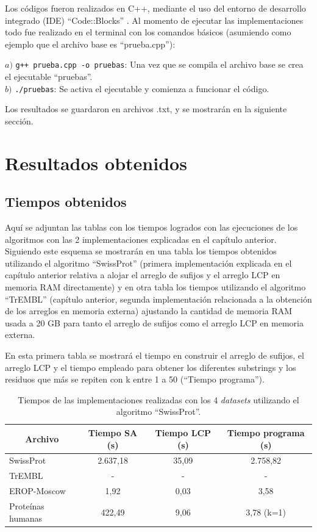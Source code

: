 Los códigos fueron realizados en C++, mediante el uso del entorno de desarrollo integrado (IDE) ``Code::Blocks'' \cite{codeblocks}. Al momento de ejecutar las implementaciones todo fue realizado en el terminal con los comandos básicos (asumiendo como ejemplo que el archivo base es ``prueba.cpp''):

$a)$ \texttt{g++ prueba.cpp -o pruebas}: Una vez que se compila el archivo base se crea el ejecutable ``pruebas''.\\
$b)$ \texttt{./pruebas}: Se activa el ejecutable y comienza a funcionar el código.

Los resultados se guardaron en archivos .txt, y se mostrarán en la siguiente sección.

\section{Resultados obtenidos}

\subsection{Tiempos obtenidos}

Aquí se adjuntan las tablas con los tiempos logrados con las ejecuciones de los algoritmos con las 2 implementaciones explicadas en el capítulo anterior. Siguiendo este esquema se mostrarán en una tabla los tiempos obtenidos utilizando el algoritmo ``SwissProt'' (primera implementación explicada en el capítulo anterior relativa a alojar el arreglo de sufijos y el arreglo LCP en memoria RAM directamente) y en otra tabla los tiempos utilizando el algoritmo ``TrEMBL'' (capítulo anterior, segunda implementación relacionada a la obtención de los arreglos en memoria externa) ajustando la cantidad de memoria RAM usada a 20 GB para tanto el arreglo de sufijos como el arreglo LCP en memoria externa. 

En esta primera tabla se mostrará el tiempo en construir el arreglo de sufijos, el arreglo LCP y el tiempo empleado para obtener los diferentes substrings y los residuos que más se repiten con k entre 1 a 50 (``Tiempo programa'').

\begin{table}[h]
\centering
\begin{tabular}{|l|c|c|c|}
\hline
\multicolumn{1}{|c|}{\textbf{Archivo}}  & \textbf{Tiempo SA (s)} & \textbf{Tiempo LCP (s)} & \textbf{Tiempo programa (s)} \\ \hline
SwissProt         & 2.637,18                & 35,09                   & 2.758,82                         \\
TrEMBL            & -                & -                &        -                  \\
EROP-Moscow       & 1,92                   & 0,03                    & 3,58                         \\
Proteínas humanas & 422,49                 & 9,06                    & 3,78 (k=1)                         \\ \hline
\end{tabular}
\caption{Tiempos de las implementaciones realizadas con los 4 \textit{datasets} utilizando el algoritmo ``SwissProt''.}
\label{tb:labelr3}
\end{table}

